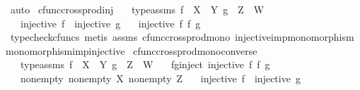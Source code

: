 \begin{isabellebody}
\ auto\isanewline
{}\isamarkupfalse%
%
\endisatagproof
{\isafoldproof}%
%
\isadelimproof
\isanewline
%
\endisadelimproof
\isanewline
{}\isamarkupfalse%
\ cfunc{\isacharunderscore}{\kern0pt}cross{\isacharunderscore}{\kern0pt}prod{\isacharunderscore}{\kern0pt}inj{\isacharcolon}{\kern0pt}\isanewline
\ \ \ type{\isacharunderscore}{\kern0pt}assms{\isacharcolon}{\kern0pt}\ {\isachardoublequoteopen}f\ {\isacharcolon}{\kern0pt}\ X\ {\isasymrightarrow}\ Y{\isachardoublequoteclose}\ {\isachardoublequoteopen}g\ {\isacharcolon}{\kern0pt}\ Z\ {\isasymrightarrow}\ W{\isachardoublequoteclose}\isanewline
\ \ \ {\isachardoublequoteopen}injective\ f\ {\isasymand}\ injective\ g{\isachardoublequoteclose}\isanewline
\ \ \ {\isachardoublequoteopen}injective\ {\isacharparenleft}{\kern0pt}f\ {\isasymtimes}\isactrlsub f\ g{\isacharparenright}{\kern0pt}{\isachardoublequoteclose}\isanewline
%
\isadelimproof
\ \ %
\endisadelimproof
%
\isatagproof
{}\isamarkupfalse%
\ {\isacharparenleft}{\kern0pt}typecheck{\isacharunderscore}{\kern0pt}cfuncs{\isacharcomma}{\kern0pt}\ metis\ assms\ cfunc{\isacharunderscore}{\kern0pt}cross{\isacharunderscore}{\kern0pt}prod{\isacharunderscore}{\kern0pt}mono\ injective{\isacharunderscore}{\kern0pt}imp{\isacharunderscore}{\kern0pt}monomorphism\ monomorphism{\isacharunderscore}{\kern0pt}imp{\isacharunderscore}{\kern0pt}injective{\isacharparenright}{\kern0pt}%
\endisatagproof
{\isafoldproof}%
%
\isadelimproof
\isanewline
%
\endisadelimproof
\isanewline
{}\isamarkupfalse%
\ cfunc{\isacharunderscore}{\kern0pt}cross{\isacharunderscore}{\kern0pt}prod{\isacharunderscore}{\kern0pt}mono{\isacharunderscore}{\kern0pt}converse{\isacharcolon}{\kern0pt}\isanewline
\ \ \ type{\isacharunderscore}{\kern0pt}assms{\isacharcolon}{\kern0pt}\ {\isachardoublequoteopen}f\ {\isacharcolon}{\kern0pt}\ X\ {\isasymrightarrow}\ Y{\isachardoublequoteclose}\ {\isachardoublequoteopen}g\ {\isacharcolon}{\kern0pt}\ Z\ {\isasymrightarrow}\ W{\isachardoublequoteclose}\isanewline
\ \ \ fg{\isacharunderscore}{\kern0pt}inject{\isacharcolon}{\kern0pt}\ {\isachardoublequoteopen}injective\ {\isacharparenleft}{\kern0pt}f\ {\isasymtimes}\isactrlsub f\ g{\isacharparenright}{\kern0pt}{\isachardoublequoteclose}\isanewline
\ \ \ nonempty{\isacharcolon}{\kern0pt}\ {\isachardoublequoteopen}nonempty\ X{\isachardoublequoteclose}\ {\isachardoublequoteopen}nonempty\ Z{\isachardoublequoteclose}\isanewline
\ \ \ {\isachardoublequoteopen}injective\ f\ {\isasymand}\ injective\ g{\isachardoublequoteclose}\isanewline

\end{isabellebody}
